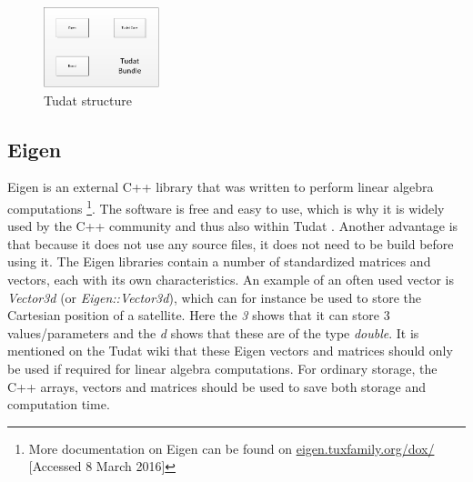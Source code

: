 \begin{figure}[!ht]
\centering
\includegraphics[width=0.3\textwidth]{figures/software/tudatBlock.png}
\caption{\ac{Tudat} structure}
\label{fig:tudatBlock}
\end{figure}

\subsection{Eigen}
\label{subsec:eigen}
Eigen is an external C++ library that was written to perform linear algebra computations \footnote{More documentation on Eigen can be found on \url{eigen.tuxfamily.org/dox/} [Accessed 8 March 2016] }. The software is free and easy to use, which is why it is widely used by the C++ community and thus also within \ac{Tudat} \citep{dirkx2016tudat}. Another advantage is that because it does not use any source files, it does not need to be build before using it. 
The Eigen libraries contain a number of standardized matrices and vectors, each with its own characteristics. An example of an often used vector is \textit{Vector3d} (or \textit{Eigen::Vector3d}), which can for instance be used to store the Cartesian position of a satellite. Here the \textit{3} shows that it can store 3 values/parameters and the \textit{d} shows that these are of the type \textit{double}. It is mentioned on the \ac{Tudat} wiki \citep{dirkx2016tudat} that these Eigen vectors and matrices should only be used if required for linear algebra computations. For ordinary storage, the C++ arrays, vectors and matrices should be used to save both storage and computation time.


